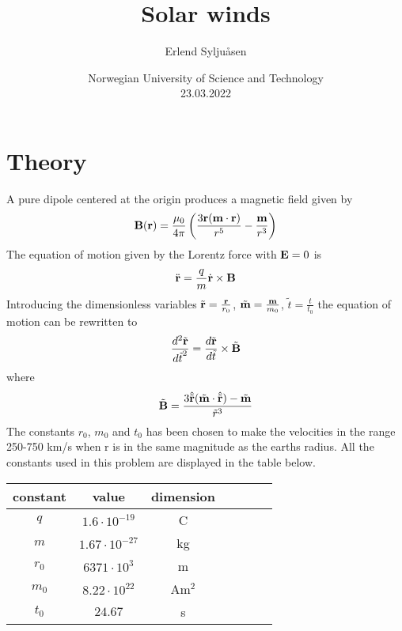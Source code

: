 \documentclass[article,11pt]{article}
\begin{document}
\title{Solar winds}
\author{Erlend Syljuåsen}
\date{Norwegian University of Science and Technology\\23.03.2022}
\maketitle

\begin{abstract}
\end{abstract}

\section{Theory}
A pure dipole centered at the origin produces a magnetic field given by
$$\vectorbold{B}(\vectorbold{r}) = \frac{\mu_0}{4\pi} \left(\frac{3\vectorbold{r}(\vectorbold{m} \cdot \vectorbold{r})}{r^5} - \frac{\vectorbold{m}}{r^3}\right)$$
The equation of motion given by the Lorentz force with $\vectorbold{E} = 0$ is 
$$\ddot{\vectorbold{r}} = \frac{q}{m} \dot{\vectorbold{r}} \times \vectorbold{B}$$
Introducing the dimensionless variables $\tilde{\vectorbold{r}}= \frac{\vectorbold{r}}{r_0}$, $\tilde{\vectorbold{m}} = \frac{\vectorbold{m}}{m_0}$, $\tilde{t}= \frac{t}{t_0}$ the equation of motion can be rewritten to
\begin{equation}
    \frac{d^2 \tilde{\vectorbold{r}}}{{d\tilde{t}}^2} = \frac{d\tilde{\vectorbold{r}}}{d\tilde{t}} \times \tilde{\vectorbold{B}}
\end{equation}
where $$\tilde{\vectorbold{B}} = \frac{3 \hat{\tilde{\vectorbold{r}}} (\tilde{\vectorbold{m}} \cdot \hat{\tilde{\vectorbold{r}}}) - \tilde{\vectorbold{m}}}{{\tilde{r}}^3}$$ 
The constants $r_0$, $m_0$ and $t_0$ has been chosen to make the velocities in the range 250-750 km/s when r is in the same magnitude as the earths radius. All the constants used in this problem are displayed in the table below.
\begin{center}
\begin{tabular}{|c|c|c|c|c|c|c|}
\hline
    constant & value & dimension\\
\hline
    $q$ & $1.6 \cdot 10^{-19}$ & C\\
    $m$ & $1.67 \cdot 10^{-27}$ & kg\\
    $r_0$ & $6371 \cdot 10^3$ & m\\ 
    $m_0$ & $8.22 \cdot 10^{22}$ & Am$^2$\\ 
    $t_0$ & $24.67$ & s\\
\hline
\end{tabular}
\label{table:constants}
\end{center}

\begin{thebibliography}{99}
\end{thebibliography}
\end{document}
